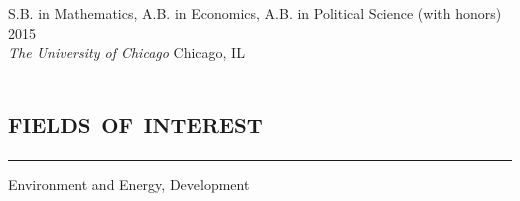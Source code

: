 \documentclass[letterpaper]{article}
\renewenvironment{itemize}{
  \begin{list}{}{
    \setlength{\leftmargin}{1em}
      \setlength{\itemsep}{0.25em}
    \setlength{\parskip}{0pt}
    \setlength{\parsep}{0pt} 
  }
}{
  \end{list}
}
\begin{document}
%

S.B. in Mathematics, A.B. in Economics, A.B. in Political Science (with honors) \hfill 2015 \\
 \emph{The University of Chicago} \hfill Chicago, IL


\section*{\textsc{\textbf{fields of interest}}}
\hrule
\vspace{.25cm}
\begin{itemize}
\item Environment and Energy, Development
\end{itemize}
\end{document}

